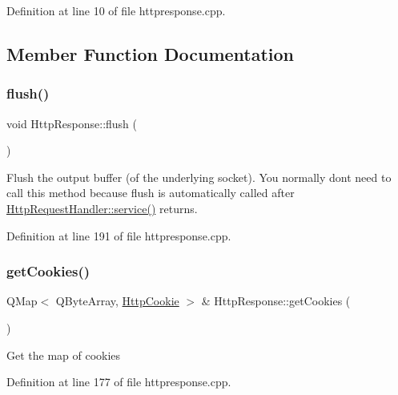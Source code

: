 Definition at line 10 of file httpresponse.\+cpp.



\subsection{Member Function Documentation}
\mbox{\label{classstefanfrings_1_1_http_response_a0d50597cae5e04e6b2110df589c6617e}} 
\subsubsection{\texorpdfstring{flush()}{flush()}}
{\footnotesize\ttfamily void Http\+Response\+::flush (\begin{DoxyParamCaption}{ }\end{DoxyParamCaption})}

Flush the output buffer (of the underlying socket). You normally don\textquotesingle{}t need to call this method because flush is automatically called after \mbox{\hyperlink{classstefanfrings_1_1_http_request_handler_a0a7210907152c46b8b5a47feb64cf6bd}{Http\+Request\+Handler\+::service()}} returns. 

Definition at line 191 of file httpresponse.\+cpp.

\mbox{\label{classstefanfrings_1_1_http_response_a1bcd416f520020e944900e35ab51864c}} 
\subsubsection{\texorpdfstring{get\+Cookies()}{getCookies()}}
{\footnotesize\ttfamily Q\+Map$<$ Q\+Byte\+Array, \mbox{\hyperlink{classstefanfrings_1_1_http_cookie}{Http\+Cookie}} $>$ \& Http\+Response\+::get\+Cookies (\begin{DoxyParamCaption}{ }\end{DoxyParamCaption})}

Get the map of cookies 

Definition at line 177 of file httpresponse.\+cpp.

